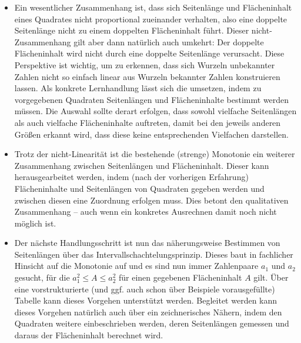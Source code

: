 \documentclass[
  ngerman,
]{scrbook}
\theoremstyle{definition}
\theoremstyle{definition}
\theoremstyle{definition}
\theoremstyle{definition}
\theoremstyle{remark}
\begin{document}
\begin{enumerate}
  \begin{itemize}
  \item
    Ein wesentlicher Zusammenhang ist, dass sich Seitenlänge und Flächeninhalt eines Quadrates nicht proportional zueinander verhalten, also eine doppelte Seitenlänge nicht zu einem doppelten Flächeninhalt führt. Dieser nicht-Zusammenhang gilt aber dann natürlich auch umkehrt: Der doppelte Flächeninhalt wird nicht durch eine doppelte Seitenlänge verursacht. Diese Perspektive ist wichtig, um zu erkennen, dass sich Wurzeln unbekannter Zahlen nicht so einfach linear aus Wurzeln bekannter Zahlen konstruieren lassen. Als konkrete Lernhandlung lässt sich die umsetzen, indem zu vorgegebenen Quadraten Seitenlängen und Flächeninhalte bestimmt werden müssen. Die Auswahl sollte derart erfolgen, dass sowohl vielfache Seitenlängen als auch vielfache Flächeninhalte auftreten, damit bei den jeweils anderen Größen erkannt wird, dass diese keine entsprechenden Vielfachen darstellen.
  \item
    Trotz der nicht-Linearität ist die bestehende (strenge) Monotonie ein weiterer Zusammenhang zwischen Seitenlängen und Flächeninhalt. Dieser kann herausgearbeitet werden, indem (nach der vorherigen Erfahrung) Flächeninhalte und Seitenlängen von Quadraten gegeben werden und zwischen diesen eine Zuordnung erfolgen muss. Dies betont den qualitativen Zusammenhang -- auch wenn ein konkretes Ausrechnen damit noch nicht möglich ist.
  \item
    Der nächste Handlungsschritt ist nun das näherungsweise Bestimmen von Seitenlängen über das Intervallschachtelungsprinzip. Dieses baut in fachlicher Hinsicht auf die Monotonie auf und es sind nun immer Zahlenpaare \(a_1\) und \(a_2\) gesucht, für die \(a_1^2 \leq A \leq a_2^2\) für einen gegebenen Flächeninhalt \(A\) gilt. Über eine vorstrukturierte (und ggf. auch schon über Beispiele vorausgefüllte) Tabelle kann dieses Vorgehen unterstützt werden. Begleitet werden kann dieses Vorgehen natürlich auch über ein zeichnerisches Nähern, indem den Quadraten weitere einbeschrieben werden, deren Seitenlängen gemessen und daraus der Flächeninhalt berechnet wird.
  \end{itemize}


\end{enumerate}
\end{document}
